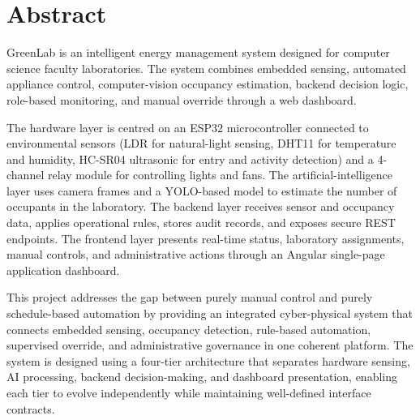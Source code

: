 \chapter*{Abstract}

GreenLab is an intelligent energy management system designed for computer science faculty laboratories. The system combines embedded sensing, automated appliance control, computer-vision occupancy estimation, backend decision logic, role-based monitoring, and manual override through a web dashboard. 

The hardware layer is centred on an ESP32 microcontroller connected to environmental sensors (LDR for natural-light sensing, DHT11 for temperature and humidity, HC-SR04 ultrasonic for entry and activity detection) and a 4-channel relay module for controlling lights and fans. The artificial-intelligence layer uses camera frames and a YOLO-based model to estimate the number of occupants in the laboratory. The backend layer receives sensor and occupancy data, applies operational rules, stores audit records, and exposes secure REST endpoints. The frontend layer presents real-time status, laboratory assignments, manual controls, and administrative actions through an Angular single-page application dashboard.

This project addresses the gap between purely manual control and purely schedule-based automation by providing an integrated cyber-physical system that connects embedded sensing, occupancy detection, rule-based automation, supervised override, and administrative governance in one coherent platform. The system is designed using a four-tier architecture that separates hardware sensing, AI processing, backend decision-making, and dashboard presentation, enabling each tier to evolve independently while maintaining well-defined interface contracts.
